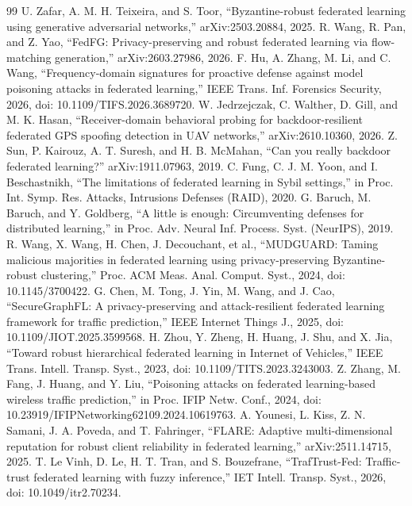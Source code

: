 \documentclass[journal]{IEEEtran}
\begin{document}
\begin{thebibliography}{99}
 U. Zafar, A. M. H. Teixeira, and S. Toor, ``Byzantine-robust federated learning using generative adversarial networks,'' arXiv:2503.20884, 2025.
 R. Wang, R. Pan, and Z. Yao, ``FedFG: Privacy-preserving and robust federated learning via flow-matching generation,'' arXiv:2603.27986, 2026.
 F. Hu, A. Zhang, M. Li, and C. Wang, ``Frequency-domain signatures for proactive defense against model poisoning attacks in federated learning,'' IEEE Trans. Inf. Forensics Security, 2026, doi: 10.1109/TIFS.2026.3689720.
 W. Jedrzejczak, C. Walther, D. Gill, and M. K. Hasan, ``Receiver-domain behavioral probing for backdoor-resilient federated GPS spoofing detection in UAV networks,'' arXiv:2610.10360, 2026.
 Z. Sun, P. Kairouz, A. T. Suresh, and H. B. McMahan, ``Can you really backdoor federated learning?'' arXiv:1911.07963, 2019.
 C. Fung, C. J. M. Yoon, and I. Beschastnikh, ``The limitations of federated learning in Sybil settings,'' in Proc. Int. Symp. Res. Attacks, Intrusions Defenses (RAID), 2020.
 G. Baruch, M. Baruch, and Y. Goldberg, ``A little is enough: Circumventing defenses for distributed learning,'' in Proc. Adv. Neural Inf. Process. Syst. (NeurIPS), 2019.
 R. Wang, X. Wang, H. Chen, J. Decouchant, et al., ``MUDGUARD: Taming malicious majorities in federated learning using privacy-preserving Byzantine-robust clustering,'' Proc. ACM Meas. Anal. Comput. Syst., 2024, doi: 10.1145/3700422.
 G. Chen, M. Tong, J. Yin, M. Wang, and J. Cao, ``SecureGraphFL: A privacy-preserving and attack-resilient federated learning framework for traffic prediction,'' IEEE Internet Things J., 2025, doi: 10.1109/JIOT.2025.3599568.
 H. Zhou, Y. Zheng, H. Huang, J. Shu, and X. Jia, ``Toward robust hierarchical federated learning in Internet of Vehicles,'' IEEE Trans. Intell. Transp. Syst., 2023, doi: 10.1109/TITS.2023.3243003.
 Z. Zhang, M. Fang, J. Huang, and Y. Liu, ``Poisoning attacks on federated learning-based wireless traffic prediction,'' in Proc. IFIP Netw. Conf., 2024, doi: 10.23919/IFIPNetworking62109.2024.10619763.
 A. Younesi, L. Kiss, Z. N. Samani, J. A. Poveda, and T. Fahringer, ``FLARE: Adaptive multi-dimensional reputation for robust client reliability in federated learning,'' arXiv:2511.14715, 2025.
 T. Le Vinh, D. Le, H. T. Tran, and S. Bouzefrane, ``TrafTrust-Fed: Traffic-trust federated learning with fuzzy inference,'' IET Intell. Transp. Syst., 2026, doi: 10.1049/itr2.70234.

\end{thebibliography}
\end{document}

